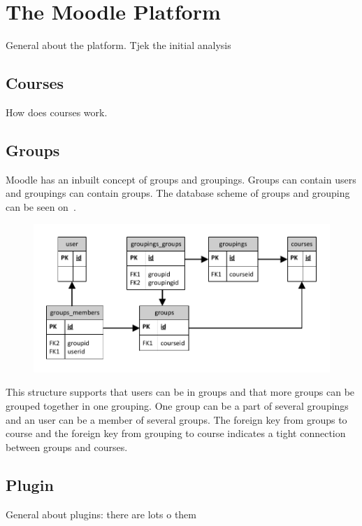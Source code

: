
\section{The Moodle Platform}
\label{sec:moodleplatform}
	General about the platform. Tjek the initial analysis






\subsection{Courses}
	How does courses work.






\subsection{Groups}
Moodle has an inbuilt concept of groups and groupings. 
Groups can contain users and groupings can contain groups. 
The database scheme of groups and grouping can be seen on~.

\begin{figure}
	\centering
		\includegraphics[width=\textwidth]{images/moodlegroups}
	\label{fig:moodlegroupsandgroupings}
\end{figure}

This structure supports that users can be in groups and that more groups can be grouped together in one grouping. 
One group can be a part of several groupings and an user can be a member of several groups. 
The foreign key from groups to course and the foreign key from grouping to course indicates a tight connection between groups and courses. 

\subsection{Plugin}
	General about plugins: there are lots o them 





